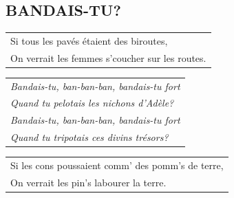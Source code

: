 \documentclass[a4paper, 14pt]{extarticle}
\begin{document}
\subsection*{BANDAIS-TU?}
\begin{flushleft}
\begin{tabularx}{0.8\textwidth} {
   >{\raggedright\arraybackslash}X}
Si tous les pavés étaient des biroutes,\\
On verrait les femmes s’coucher sur les routes.\\
\end{tabularx}
\end{flushleft}
\begin{flushleft}
\begin{tabularx}{0.8\textwidth} {
   >{\raggedright\arraybackslash}X}
\textit{Bandais-tu, ban-ban-ban, bandais-tu fort}\\
\textit{Quand tu pelotais les nichons d’Adèle?}\\
\textit{Bandais-tu, ban-ban-ban, bandais-tu fort}\\
\textit{Quand tu tripotais ces divins trésors?}\\
\end{tabularx}
\end{flushleft}
\begin{flushleft}
\begin{tabularx}{0.8\textwidth} {
   >{\raggedright\arraybackslash}X}
Si les cons poussaient comm’ des pomm’s de terre,\\
On verrait les pin’s labourer la terre.\\
\end{tabularx}
\end{flushleft}
\end{document}
